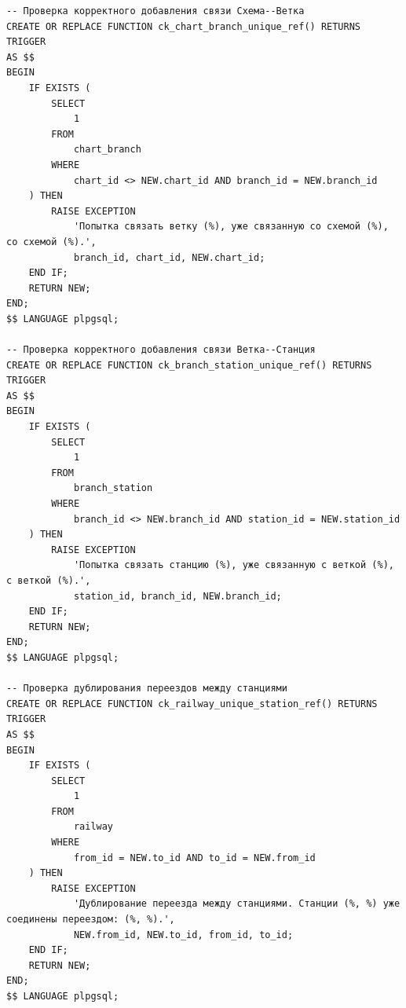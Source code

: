 \clearpage

\begin{lstlisting}[label=lst:ck:tr:funcs:1,caption=Реализация проверяющий триггерных функций (часть 1),firstnumber=1]
-- Проверка корректного добавления связи Схема--Ветка
CREATE OR REPLACE FUNCTION ck_chart_branch_unique_ref() RETURNS TRIGGER
AS $$
BEGIN
    IF EXISTS (
        SELECT
            1
        FROM
            chart_branch
        WHERE
            chart_id <> NEW.chart_id AND branch_id = NEW.branch_id
    ) THEN
        RAISE EXCEPTION
            'Попытка связать ветку (%), уже связанную со схемой (%), со схемой (%).',
            branch_id, chart_id, NEW.chart_id;
    END IF;
    RETURN NEW;
END;
$$ LANGUAGE plpgsql;

-- Проверка корректного добавления связи Ветка--Станция
CREATE OR REPLACE FUNCTION ck_branch_station_unique_ref() RETURNS TRIGGER
AS $$
BEGIN
    IF EXISTS (
        SELECT
            1
        FROM
            branch_station
        WHERE
            branch_id <> NEW.branch_id AND station_id = NEW.station_id
    ) THEN
        RAISE EXCEPTION
            'Попытка связать станцию (%), уже связанную с веткой (%), с веткой (%).',
            station_id, branch_id, NEW.branch_id;
    END IF;
    RETURN NEW;
END;
$$ LANGUAGE plpgsql;

-- Проверка дублирования переездов между станциями
CREATE OR REPLACE FUNCTION ck_railway_unique_station_ref() RETURNS TRIGGER
AS $$
BEGIN
    IF EXISTS (
        SELECT
            1
        FROM
            railway
        WHERE
            from_id = NEW.to_id AND to_id = NEW.from_id
    ) THEN
        RAISE EXCEPTION
            'Дублирование переезда между станциями. Станции (%, %) уже соединены переездом: (%, %).',
            NEW.from_id, NEW.to_id, from_id, to_id;
    END IF;
    RETURN NEW;
END;
$$ LANGUAGE plpgsql;
\end{lstlisting}

\clearpage

